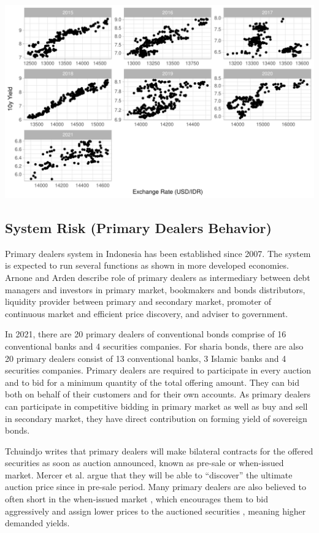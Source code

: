 \documentclass[11pt,a4paper,]{article}
\begin{document}
\includegraphics{Untitled_files/figure-latex/corfx-1.pdf}

\hypertarget{system-risk-primary-dealers-behavior}{%
\subsection{System Risk (Primary Dealers Behavior)}\label{system-risk-primary-dealers-behavior}}

Primary dealers system in Indonesia has been established since 2007. The system is expected to run several functions as shown in more developed economies. Arnone and Arden \autocite*{Arnone2003} describe role of primary dealers as intermediary between debt managers and investors in primary market, bookmakers and bonds distributors, liquidity provider between primary and secondary market, promoter of continuous market and efficient price discovery, and adviser to government.

In 2021, there are 20 primary dealers of conventional bonds comprise of 16 conventional banks and 4 securities companies. For sharia bonds, there are also 20 primary dealers consist of 13 conventional banks, 3 Islamic banks and 4 securities companies. Primary dealers are required to participate in every auction and to bid for a minimum quantity of the total offering amount. They can bid both on behalf of their customers and for their own accounts. As primary dealers can participate in competitive bidding in primary market as well as buy and sell in secondary market, they have direct contribution on forming yield of sovereign bonds.

Tchuindjo \autocite*{Tchuindjo2015} writes that primary dealers will make bilateral contracts for the offered securities as soon as auction announced, known as pre-sale or when-issued market. Mercer et al. \autocite*{Mercer2013} argue that they will be able to ``discover'' the ultimate auction price since in pre-sale period. Many primary dealers are also believed to often short in the when-issued market \autocite{Nyborg2004}, which encourages them to bid aggressively and assign lower prices to the auctioned securities \autocite{Tchuindjo2015}, meaning higher demanded yields.
\end{document}
